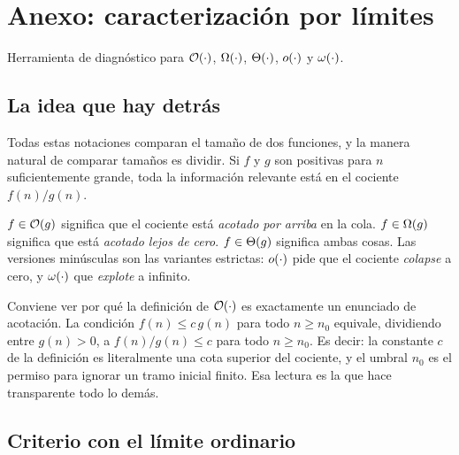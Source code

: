 \documentclass[11pt,letterpaper]{article}
\begin{document}
\newpage


\section{Anexo: caracterización por límites}

Herramienta de diagnóstico para $\mathcal{O}\!\left(\cdot\right)$, $\Omega\!\left(\cdot\right)$,
$\Theta\!\left(\cdot\right)$, $o\!\left(\cdot\right)$ y $\omega\!\left(\cdot\right)$.

\subsection*{La idea que hay detrás}

Todas estas notaciones comparan el tamaño de dos funciones, y la
manera natural de comparar tamaños es dividir. Si $f$ y $g$ son
positivas para $n$ suficientemente grande, toda la información
relevante está en el cociente $f(n)/g(n)$.

\begin{idea}[title={Traducción de cada notación al cociente}]
    $f \in \mathcal{O}\!\left(g\right)$ significa que el cociente está \emph{acotado por
    arriba} en la cola. $f \in \Omega\!\left(g\right)$ significa que está
    \emph{acotado lejos de cero}. $f \in \Theta\!\left(g\right)$ significa ambas
    cosas. Las versiones minúsculas son las variantes estrictas:
    $o\!\left(\cdot\right)$ pide que el cociente \emph{colapse} a cero, y
    $\omega\!\left(\cdot\right)$ que \emph{explote} a infinito.
\end{idea}

Conviene ver por qué la definición de $\mathcal{O}\!\left(\cdot\right)$ es exactamente un
enunciado de acotación. La condición $f(n) \leq c\,g(n)$ para todo
$n \geq n_0$ equivale, dividiendo entre $g(n) > 0$, a
$f(n)/g(n) \leq c$ para todo $n \geq n_0$. Es decir: la constante $c$
de la definición es literalmente una cota superior del cociente, y el
umbral $n_0$ es el permiso para ignorar un tramo inicial finito. Esa
lectura es la que hace transparente todo lo demás.


\subsection*{Criterio con el límite ordinario}
\end{document}
